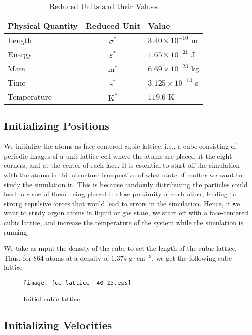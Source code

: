 \documentclass[../Main.tex]{subfiles}
\begin{document}
\begin{table}[H]
	\centering
	\begin{tabular}{ |l|c|l| }
		\hline
		Physical Quantity & Reduced Unit & Value \\
		\hline
		Length & $\sigma^{*}$ & $3.40 \times 10^{-10}$ m \\
		Energy & $\varepsilon^{*}$ & $1.65 \times 10^{-21}$ J \\
		Mass & $\mbox{m}^{*}$ & $ 6.69 \times 10^{-23}$ kg\\
		Time & $\mbox{s}^{*}$ & $3.125 \times 10^{-13}$ s \\
		Temperature & $\mbox{K}^{*}$ & $119.6$ K \\
		\hline
	\end{tabular}
	\caption{Reduced Units and their Values}
	\label{tbl:reduced_units}
\end{table}

\subsection{Initializing Positions}

We initialize the atoms as face-centered cubic lattice, i.e., a cube consisting of periodic images of a unit lattice cell where the atoms are placed at the eight corners, and at the center of each face. It is essential to start off the simulation with the atoms in this structure irrespective of what state of matter we want to study the simulation in. This is because randomly distributing the particles could lead to some of them being placed in close proximity of each other, leading to strong repulsive forces that would lead to errors in the simulation. Hence, if we want to study argon atoms in liquid or gas state, we start off with a face-centered cubic lattice, and increase the temperature of the system while the simulation is running.

We take as input the density of the cube to set the length of the cubic lattice. Thus, for 864 atoms at a density of $1.374 \mbox{ g}\cdot\mbox{cm}^{-3}$, we get the following cube lattice
 
\begin{figure}[H]
\centering
	\texttt{[image: fcc\_lattice\_-40\_25.eps]}
  	\caption{Initial cubic lattice}
	\label{fig:initial_cubic_lattice}
\end{figure}

\subsection{Initializing Velocities}
\end{document}
